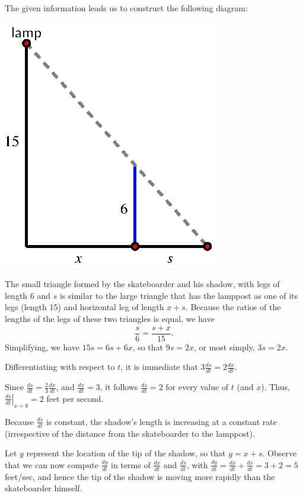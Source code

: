 \begin{activitySolution}
\ba
	\item The given information leads us to construct the following diagram:
	\begin{center}
	\includegraphics{figures/3_5_Act3Soln.eps}
	\end{center}
	\item The small triangle formed by the skateboarder and his shadow, with legs of length $6$ and $s$ is similar to the large triangle that has the lamppost as one of its legs (length 15) and horizontal leg of length $x + s$.  Because the ratios of the lengths of the legs of these two triangles is equal, we have
	$$\frac{s}{6} = \frac{s+x}{15}.$$  
	Simplifying, we have $15s = 6s + 6x$, so that $9s = 2x$, or most simply, $3s = 2x$.
	\item Differentiating with respect to $t$, it is immediate that $3 \frac{ds}{dt} = 2\frac{dx}{dt}$.
	\item Since $\frac{ds}{dt} = \frac{2}{3} \frac{dx}{dt}$, and $\frac{dx}{dt} = 3$, it follows $\frac{ds}{dt} = 2$ for every value of $t$ (and $x$).  Thus, $\left. \frac{ds}{dt} \right|_{x=8} = 2$ feet per second.
	\item Because $\frac{ds}{dt}$ is constant, the shadow's length is increasing at a constant rate (irrespective of the distance from the skateboarder to the lamppost). 
	\item Let $y$ represent the location of the tip of the shadow, so that $y = x + s$.  Observe that we can now compute $\frac{dy}{dt}$ in terms of $\frac{dx}{dt}$ and $\frac{ds}{dt}$, with $\frac{dy}{dt} = \frac{dx}{dt} + \frac{ds}{dt} = 3 + 2 = 5$ feet/sec, and hence the tip of the shadow is moving more rapidly than the skateboarder himself.
\ea
\end{activitySolution}
\aftera





